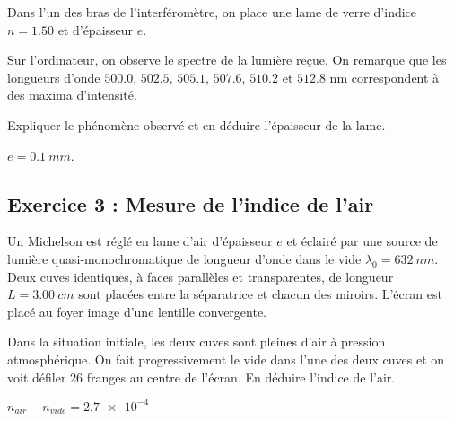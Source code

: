 Dans l'un des bras de l'interféromètre, on place une lame de verre d'indice $n=1.50$ et d'épaisseur $e$.

Sur l'ordinateur, on observe le spectre de la lumière reçue. On remarque que les longueurs d'onde $500.0$, $502.5$, $505.1$, $507.6$, $510.2$ et $512.8$ nm correspondent à des maxima d'intensité.

Expliquer le phénomène observé et en déduire l'épaisseur de la lame.

 $e = \SI{0.1}{mm}$.

\subsection{Exercice 3 : Mesure de l'indice de l'air}

Un Michelson est réglé en lame d'air d'épaisseur $e$ et éclairé par une source de lumière quasi-monochromatique de longueur d'onde dans le vide $\lambda_0 = \SI{632}{nm}$. Deux cuves identiques, à faces parallèles et transparentes, de longueur $L=\SI{3.00}{cm}$ sont placées entre la séparatrice et chacun des miroirs. L'écran est placé au foyer image d'une lentille convergente.

Dans la situation initiale, les deux cuves sont pleines d'air à pression atmosphérique. On fait progressivement le vide dans l'une des deux cuves et on voit défiler $26$ franges au centre de l'écran. En déduire l'indice de l'air.

 $n_{air} - n_{vide} = \SI{2.7e-4}{}$